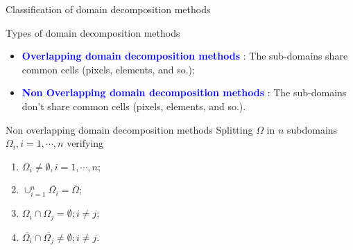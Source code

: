 \documentclass[compress,10pt,aspectratio=169]{beamer}
\begin{document}
\begin{frame}[fragile]{Classification of domain decomposition methods}
    \scriptsize

    \begin{block}{\small Types of domain decomposition methods}
        \begin{itemize}
            \item \textcolor{blue}{\bf Overlapping domain decomposition methods} : The sub-domains share common cells (pixels, elements, and so.);
            \item \textcolor{blue}{\bf Non Overlapping domain decomposition methods} : The sub-domains don't share common cells (pixels, elements, and so.).
        \end{itemize}
    \end{block}

    \begin{multicols}{2}
    \begin{alertblock}{\small Non overlapping domain decomposition methods}
        Splitting $\Omega$ in $n$ subdomains $\Omega_{i}, i=1,\cdots,n$ verifying 
        \begin{enumerate}
            \item $\Omega_{i}\neq \emptyset, i=1,\cdots,n$;
            \item $\cup_{i=1}^{n} \overline{\Omega_{i}} = \overline{\Omega}$;
            \item $\Omega_{i} \cap \Omega_{j} = \emptyset; i\neq j$;
            \item $\overline{\Omega_{i}} \cap \overline{\Omega_{j}} \neq \emptyset; i\neq j$.
        \end{enumerate}
    \end{alertblock}

    \begin{figure}
\end{figure}
\end{multicols}
\end{frame}
\end{document}
